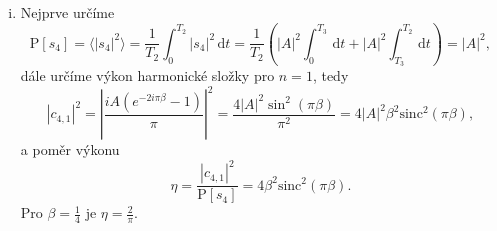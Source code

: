 \documentclass{article}
\begin{document}
\begin{enumerate}[(i)]
\item Nejprve určíme
\[
    \text{P}\left[s_4\right] = \langle |s_4|^2\rangle = \frac{1}{T_2}\int_{0}^{T_2}|s_4|^2 \,\mathrm{d}t = \frac{1}{T_2}\left(|A|^2\int_{0}^{T_3}\,\mathrm{d}t +|A|^2\int_{T_3}^{T_2}\,\mathrm{d}t \right) = |A|^2,
\]
dále určíme výkon harmonické složky pro $n = 1$, tedy
\[
    |c_{4,1}|^2 = \left| \frac{i A \left(e^{-2 i \pi  \beta }-1\right)}{\pi }\right|^2 = \frac{4 |A|^2 \sin ^2(\pi  \beta )}{\pi ^2} = 4|A|^2\beta^2\text{sinc}^2(\pi\beta),
\]
a poměr výkonu
\[
    \eta = \frac{|c_{4,1}|^2}{\text{P}\left[s_4\right]} = 4\beta^2 \text{sinc}^2(\pi\beta).
\]
Pro $\beta = \frac{1}{4}$ je $\eta = \frac{2}{\pi}$.

\end{enumerate}
\end{document}
